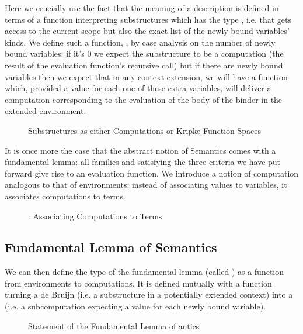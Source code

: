 Here we crucially use the fact that the meaning of a description is
defined in terms of a function interpreting substructures which has
the type    , i.e. that gets access
to the current scope but also the exact list of the newly bound variables' kinds.
We define such a function, , by case analysis on the number
of newly bound variables: if it's $0$ we expect the substructure
to be a computation (the result of the evaluation function's
recursive call) but if there are newly bound variables then we expect
that in any context extension, we will have a function which, provided
a value for each one of these extra variables, will deliver a computation
corresponding to the evaluation of the body of the binder in the extended
environment.

\begin{figure}[h]
\caption{Substructures as either Computations or Kripke Function Spaces}
\end{figure}

It is once more the case that the abstract notion of Semantics comes
with a fundamental lemma: all   families  and
 satisfying the three criteria we have put forward give rise
to an evaluation function. We introduce a notion of computation
 analogous to that of environments: instead of associating
values to variables, it associates computations to terms.

\begin{figure}[h]
\caption{: Associating Computations to Terms}
\end{figure}

\subsection{Fundamental Lemma of Semantics}

We can then define the type of the fundamental lemma (called ) as
a function from environments to computations. It is defined mutually with a
function  turning a de Bruijn  (i.e. a substructure in a
potentially extended context) into a  (i.e. a subcomputation
expecting a value for each newly bound variable).

\begin{figure}[h]
\caption{Statement of the Fundamental Lemma of antics}
\end{figure}

